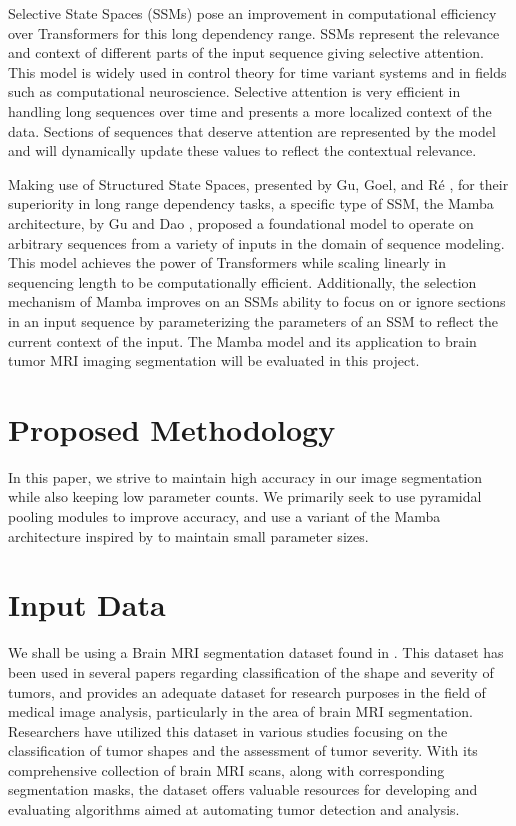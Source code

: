 \documentclass[conference]{IEEEtran}
\begin{document}
Selective State Spaces (SSMs) pose an improvement in computational efficiency over Transformers for this long dependency range. SSMs represent the relevance and context of different parts of the input sequence giving selective attention. This model is widely used in control theory for time variant systems and in fields such as computational neuroscience. Selective attention is very efficient in handling long sequences over time and presents a more localized context of the data. Sections of sequences that deserve attention are represented by the model and will dynamically update these values to reflect the contextual relevance.

Making use of Structured State Spaces, presented by Gu, Goel, and Ré \cite{gu2022efficiently}, for their superiority in long range dependency tasks, a specific type of SSM, the Mamba architecture, by Gu and Dao \cite{gu2023mamba}, proposed a foundational model to operate on arbitrary sequences from a variety of inputs in the domain of sequence modeling. This model achieves the power of Transformers while scaling linearly in sequencing length to be computationally efficient. Additionally, the selection mechanism of Mamba improves on an SSMs ability to focus on or ignore sections in an input sequence by parameterizing the parameters of an SSM to reflect the current context of the input. The Mamba model and its application to brain tumor MRI imaging segmentation will be evaluated in this project.

\section{Proposed Methodology}
In this paper, we strive to maintain high accuracy in our image segmentation while also keeping low parameter counts. We primarily seek to use pyramidal pooling modules \cite{zhao2017pyramid} to improve accuracy, and use a variant of the Mamba \cite{gu2023mamba} architecture inspired by \cite{wu2024ultralight} to maintain small parameter sizes.

\section{Input Data}\label{sec2}
We shall be using a Brain MRI segmentation dataset found in \cite{dataset}. This dataset has been used in several papers regarding classification of the shape and severity of tumors, and provides an adequate dataset for research purposes in the field of medical image analysis, particularly in the area of brain MRI segmentation. Researchers have utilized this dataset in various studies focusing on the classification of tumor shapes and the assessment of tumor severity. With its comprehensive collection of brain MRI scans, along with corresponding segmentation masks, the dataset offers valuable resources for developing and evaluating algorithms aimed at automating tumor detection and analysis.
\end{document}

